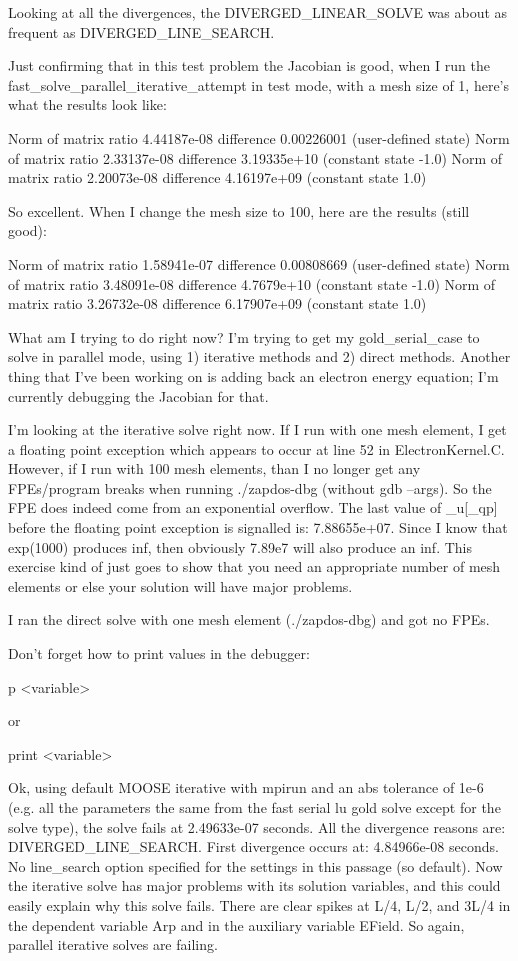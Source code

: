 Looking at all the divergences, the DIVERGED_LINEAR_SOLVE was about as frequent as DIVERGED_LINE_SEARCH.

Just confirming that in this test problem the Jacobian is good, when I run the fast_solve_parallel_iterative_attempt in test mode, with a mesh size of 1, here's what the results look like:

Norm of matrix ratio 4.44187e-08 difference 0.00226001 (user-defined state)
Norm of matrix ratio 2.33137e-08 difference 3.19335e+10 (constant state -1.0)
Norm of matrix ratio 2.20073e-08 difference 4.16197e+09 (constant state 1.0)

So excellent. When I change the mesh size to 100, here are the results (still good):

Norm of matrix ratio 1.58941e-07 difference 0.00808669 (user-defined state)
Norm of matrix ratio 3.48091e-08 difference 4.7679e+10 (constant state -1.0)
Norm of matrix ratio 3.26732e-08 difference 6.17907e+09 (constant state 1.0)

What am I trying to do right now? I'm trying to get my gold_serial_case to solve in parallel mode, using 1) iterative methods and 2) direct methods. Another thing that I've been working on is adding back an electron energy equation; I'm currently debugging the Jacobian for that.

I'm looking at the iterative solve right now. If I run with one mesh element, I get a floating point exception which appears to occur at line 52 in ElectronKernel.C. However, if I run with 100 mesh elements, than I no longer get any FPEs/program breaks when running ./zapdos-dbg (without gdb --args). So the FPE does indeed come from an exponential overflow. The last value of _u[_qp] before the floating point exception is signalled is: 7.88655e+07. Since I know that exp(1000) produces inf, then obviously 7.89e7 will also produce an inf. This exercise kind of just goes to show that you need an appropriate number of mesh elements or else your solution will have major problems.

I ran the direct solve with one mesh element (./zapdos-dbg) and got no FPEs.

Don't forget how to print values in the debugger:

p <variable>

or

print <variable>

Ok, using default MOOSE iterative with mpirun and an abs tolerance of 1e-6 (e.g. all the parameters the same from the fast serial lu gold solve except for the solve type), the solve fails at 2.49633e-07 seconds. All the divergence reasons are: DIVERGED_LINE_SEARCH. First divergence occurs at: 4.84966e-08 seconds. No line_search option specified for the settings in this passage (so default). Now the iterative solve has major problems with its solution variables, and this could easily explain why this solve fails. There are clear spikes at L/4, L/2, and 3L/4 in the dependent variable Arp and in the auxiliary variable EField. So again, parallel iterative solves are failing.

